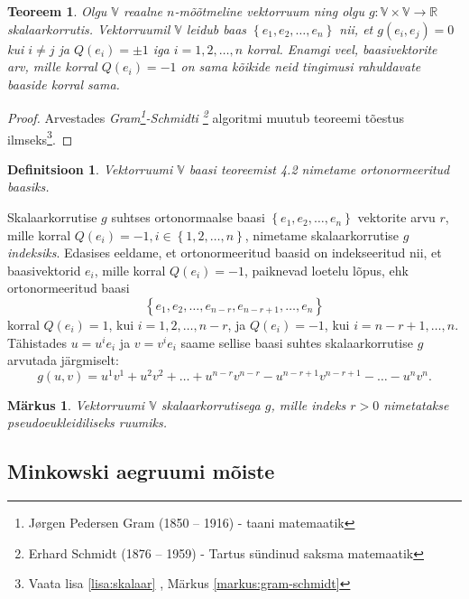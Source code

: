 \documentclass[a4paper,12pt]{article}
\newtheorem{teoreem}{Teoreem}[section]
\newtheorem{markus}{Märkus}[section]
\newtheorem{definitsioon}{Definitsioon}[section]
\numberwithin{equation}{section}
\begin{document}
\begin{teoreem}
Olgu $\mathbb{V}$ reaalne $n$-mõõtmeline vektorruum ning olgu $g : \mathbb{V} \times \mathbb{V} \rightarrow \mathbb{R}$ skalaarkorrutis. Vektorruumil $\mathbb{V}$ leidub baas $\left\lbrace e_1, e_2, \dots, e_n \right\rbrace$ nii, et $g \left(e_i, e_j\right) = 0$ kui $i \neq j$ ja $Q\left(e_i\right) = \pm 1$ iga $i = 1, 2, \dots, n$ korral. Enamgi veel, baasivektorite arv, mille korral $Q \left(e_i\right) = -1$ on sama kõikide neid tingimusi rahuldavate baaside korral sama.
\end{teoreem}

\begin{proof}
Arvestades \textit{Gram\footnote{Jørgen Pedersen Gram (1850 – 1916) - taani matemaatik}-Schmidti \footnote{Erhard Schmidt (1876 – 1959) - Tartus sündinud saksma matemaatik}} algoritmi muutub teoreemi tõestus ilmseks\footnote{Vaata lisa \ref{lisa:skalaar} , Märkus \ref{markus:gram-schmidt}}.
\end{proof}

\begin{definitsioon}
Vektorruumi $\mathbb{V}$ baasi teoreemist 4.2 nimetame ortonormeeritud baasiks.
\end{definitsioon}

Skalaarkorrutise $g$ suhtses ortonormaalse baasi $\left\lbrace e_1, e_2, \dots, e_n \right\rbrace$ vektorite arvu $r$, mille korral $Q \left(e_i\right) = -1, i \in \left\lbrace 1, 2, \dots, n \right\rbrace$, nimetame skalaarkorrutise $g$ \emph{indeksiks}.
Edasises eeldame, et ortonormeeritud baasid on indekseeritud nii, et baasivektorid $e_i$, mille korral $Q \left(e_i\right) = -1$, paiknevad loetelu lõpus, ehk ortonormeeritud baasi 
\[\left\lbrace e_1, e_2, \dots, e_{n-r}, e_{n-r+1}, \dots, e_n \right\rbrace\]
korral $Q \left(e_i\right) = 1$, kui $i = 1, 2, \dots, n-r$, ja $Q \left(e_i\right) = -1$, kui $i = n-r+1, \dots, n$. Tähistades $u = u^i e_i$ ja $v = v^i e_i$ saame sellise baasi suhtes skalaarkorrutise $g$ arvutada järgmiselt:
\[g\left(u, v\right) = u^1 v^1 + u^2 v^2 + \dots + u^{n-r} v^{n-r} - u^{n-r+1} v^{n-r+1} - \dots - u^n v^n.\]

\begin{markus}
Vektorruumi $\mathbb{V}$ skalaarkorrutisega $g$, mille indeks $r > 0$ nimetatakse \emph{pseudoeukleidiliseks ruumiks}.
\end{markus}


\subsection{Minkowski aegruumi mõiste}
\end{document}
